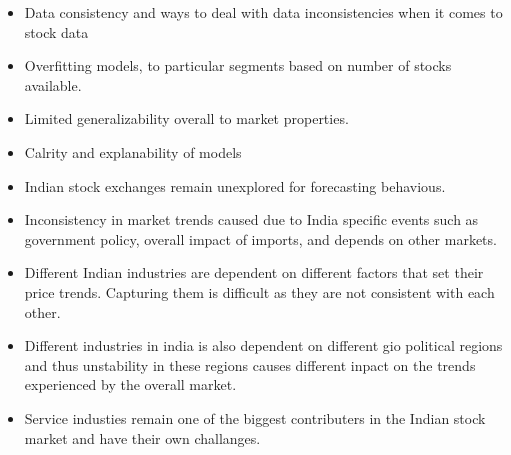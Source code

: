 \begin{itemize}
    \item Data consistency and ways to deal with data inconsistencies when it comes to stock data
    \item Overfitting models, to particular segments based on number of stocks available.
    \item Limited generalizability overall to market properties.
    \item Calrity and explanability of models
    \item Indian stock exchanges remain unexplored for forecasting behavious.
    \item Inconsistency in market trends caused due to India specific events such as government policy, overall impact of imports, and depends on other markets.
    \item Different Indian industries are dependent on different factors that set their price trends. Capturing them is difficult as they are not consistent with each other.
    \item Different industries in india is also dependent on different gio political regions and thus unstability in these regions causes different inpact on the trends experienced by the overall market.
    \item Service industies remain one of the biggest contributers in the Indian stock market and have their own challanges.
\end{itemize}
